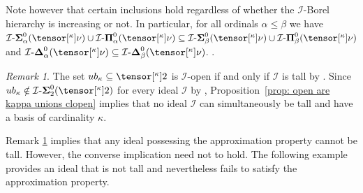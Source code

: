 \documentclass{amsart}
\numberwithin{equation}{section}
\newcommand{\I}{\mathcal{I}}
\newcommand{\pre}[2]{\tensor[^{#1}]{#2}{}}
\newcommand{\1}{\mathbf{I}}
\newcommand{\2}{\mathbf{II}}
\newcommand{\Siid}[2]{\I\text{-}\boldsymbol{\Sigma}^{ #1 }_{ #2}}
\newcommand{\Piid}[2]{\I\text{-}\boldsymbol{\Pi}^{ #1 }_{ #2 }}
\newcommand{\Deid}[2]{\I\text{-}\boldsymbol{\Delta}^{ #1 }_{ #2}}
\renewcommand{\a}{\alpha}
\renewcommand{\b}{\beta}
\renewcommand{\k}{\kappa}
\theoremstyle{definition}
\theoremstyle{remark}
\newtheorem{remark}[theorem]{Remark}
\begin{document}
Note however that certain inclusions hold regardless of whether the \(\I\)-Borel hierarchy is increasing or not. In particular, for all ordinals \(\a\leq \b\) we have 
 \(\Siid{0}{\alpha}(\pre{\k}{\nu})\cup \Piid{0}{\alpha}(\pre{\k}{\nu})\subseteq \Siid{0}{\beta}(\pre{\k}{\nu})\cup \Piid{0}{\beta}(\pre{\k}{\nu})\) and \(\Deid{0}{\a}(\pre{\k}{\nu}) \subseteq \Deid{0}{\b}(\pre{\k}{\nu})\).
.

\begin{remark} \label{rmrk:tall} The set \(ub_\k \subseteq \pre{\k}{2}\) is \(\I\)-open if and only if \(\I\) is tall by \cite[Corollary 3.9]{HKSW22}. Since \(ub_\k \notin \Siid{0}{2}(\pre{\k}{2})\) for every ideal \(\I\) by \cite[Theorem 3.10]{HKSW22}, Proposition~\ref{prop: open are kappa unions clopen} implies that no ideal \(\I\) can simultaneously be tall and have a basis of cardinality \(\k\). %
\end{remark}
Remark \ref{rmrk:tall} implies that any ideal possessing the approximation property cannot be tall. However, the converse implication need not to hold. The following example provides an ideal that is not tall and nevertheless fails to satisfy the approximation property.
\end{document}
